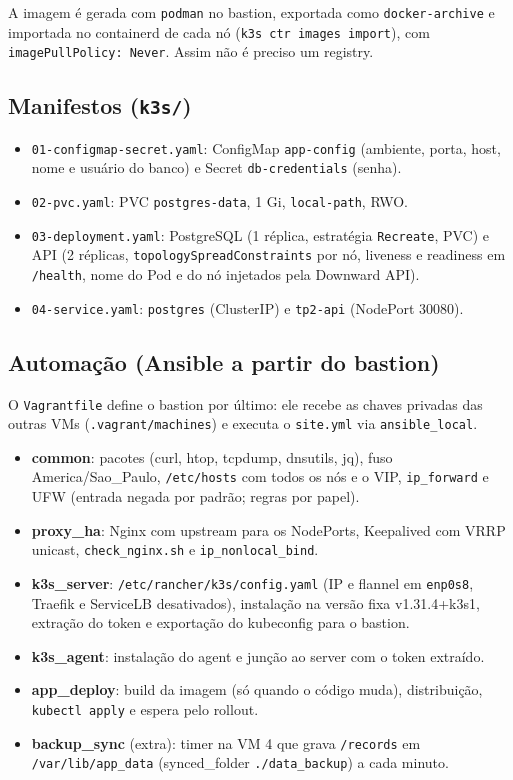 \documentclass[11pt,a4paper]{article}
\begin{document}
A imagem é gerada com \texttt{podman} no bastion, exportada como \texttt{docker-archive}
e importada no containerd de cada nó (\texttt{k3s ctr images import}), com
\texttt{imagePullPolicy: Never}. Assim não é preciso um registry.

\subsection{Manifestos (\texttt{k3s/})}
\begin{itemize}
\item \texttt{01-configmap-secret.yaml}: ConfigMap \texttt{app-config} (ambiente, porta, host,
  nome e usuário do banco) e Secret \texttt{db-credentials} (senha).
\item \texttt{02-pvc.yaml}: PVC \texttt{postgres-data}, 1 Gi, \texttt{local-path}, RWO.
\item \texttt{03-deployment.yaml}: PostgreSQL (1 réplica, estratégia \texttt{Recreate}, PVC) e
  API (2 réplicas, \texttt{topologySpreadConstraints} por nó, liveness e readiness em
  \texttt{/health}, nome do Pod e do nó injetados pela Downward API).
\item \texttt{04-service.yaml}: \texttt{postgres} (ClusterIP) e \texttt{tp2-api} (NodePort 30080).
\end{itemize}

\subsection{Automação (Ansible a partir do bastion)}
O \texttt{Vagrantfile} define o bastion por último: ele recebe as chaves privadas das outras
VMs (\texttt{.vagrant/machines}) e executa o \texttt{site.yml} via \texttt{ansible\_local}.
\begin{itemize}
\item \textbf{common}: pacotes (curl, htop, tcpdump, dnsutils, jq), fuso
  America/Sao\_Paulo, \texttt{/etc/hosts} com todos os nós e o VIP, \texttt{ip\_forward} e UFW
  (entrada negada por padrão; regras por papel).
\item \textbf{proxy\_ha}: Nginx com upstream para os NodePorts, Keepalived com VRRP unicast,
  \texttt{check\_nginx.sh} e \texttt{ip\_nonlocal\_bind}.
\item \textbf{k3s\_server}: \texttt{/etc/rancher/k3s/config.yaml} (IP e flannel em
  \texttt{enp0s8}, Traefik e ServiceLB desativados), instalação na versão fixa
  v1.31.4+k3s1, extração do token e exportação do kubeconfig para o bastion.
\item \textbf{k3s\_agent}: instalação do agent e junção ao server com o token extraído.
\item \textbf{app\_deploy}: build da imagem (só quando o código muda), distribuição,
  \texttt{kubectl apply} e espera pelo rollout.
\item \textbf{backup\_sync} (extra): timer na VM 4 que grava \texttt{/records} em
  \texttt{/var/lib/app\_data} (synced\_folder \texttt{./data\_backup}) a cada minuto.
\end{itemize}
\end{document}
